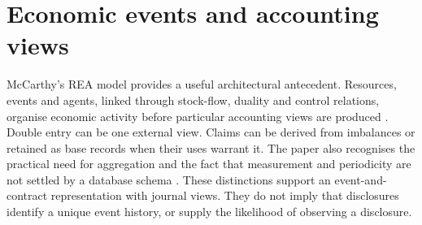 
\section{Economic events and accounting views}
McCarthy's REA model provides a useful architectural antecedent. Resources,
events and agents, linked through stock-flow, duality and control relations,
organise economic activity before particular accounting views are produced
\cite[pp.~560--570]{litclosemccarthy}. Double entry can be one external view. Claims
can be derived from imbalances or retained as base records when their uses
warrant it. The paper also recognises the practical need for aggregation and
the fact that measurement and periodicity are not settled by a database schema
\cite[pp.~568--576]{litclosemccarthy}. These distinctions support an event-and-contract
representation with journal views. They do not imply that disclosures identify
a unique event history, or supply the likelihood of observing a disclosure.


